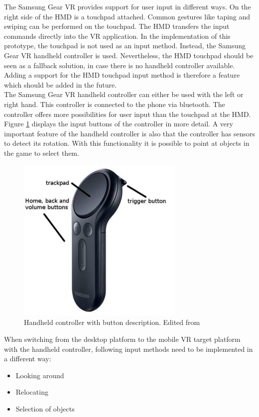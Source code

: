 The Samsung Gear VR provides support for user input in different ways. On the right side of the HMD is a touchpad attached. Common gestures like taping and swiping can be performed on the touchpad. The HMD transfers the input commands directly into the VR application. In the implementation of this prototype, the touchpad is not used as an input method. Instead, the Samsung Gear VR handheld controller is used. Nevertheless, the HMD touchpad should be seen as a fallback solution, in case there is no handheld controller available. Adding a support for the HMD touchpad input method is therefore a feature which should be added in the future.\\
The Samsung Gear VR handheld controller can either be used with the left or right hand. This controller is connected to the phone via bluetooth. The controller offers more possibilities for user input than the touchpad at the HMD. Figure \ref{fig:controller} displays the input buttons of the controller in more detail.
A very important feature of the handheld controller is also that the controller has sensors to detect its rotation. With this functionality it is possible to point at objects in the game to select them.\\
\begin{figure}[h!]
  \includegraphics[width=8cm]{kapitel/eps/samsung-controller.pdf}
  \centering
  \caption{Handheld controller with button description. Edited from \cite{Samsung.2019b}}
  \label{fig:controller}
\end{figure}
When switching from the desktop platform to the mobile VR target platform with the handheld controller, following input methods need to be implemented in a different way:
\begin{itemize}
\item Looking around
\item Relocating
\item Selection of objects
\end{itemize}

